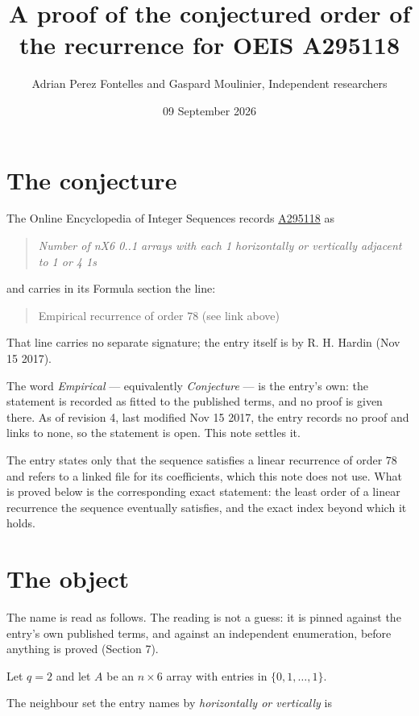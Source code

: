 \documentclass[11pt]{article}
\title{A proof of the conjectured order of the recurrence for OEIS A295118}
\author{Adrian Perez Fontelles and Gaspard Moulinier, Independent researchers}
\date{09 September 2026}
\theoremstyle{definition}
\begin{document}
\maketitle
\section{The conjecture}

The Online Encyclopedia of Integer Sequences records \href{https://oeis.org/A295118}{A295118} as

\begin{quote}\itshape Number of nX6 0..1 arrays with each 1 horizontally or vertically adjacent to 1 or 4 1s\end{quote}

and carries in its Formula section the line:

\begin{quote}\ttfamily Empirical recurrence of order 78 (see link above)\end{quote}

That line carries no separate signature; the entry itself is by R. H. Hardin (Nov 15 2017).

The word {\itshape Empirical} --- equivalently {\itshape Conjecture} --- is the entry's own: the statement is recorded as fitted to the published terms, and no proof is given there. As of revision 4, last modified Nov 15 2017, the entry records no proof and links to none, so the statement is open. This note settles it.

The entry states only that the sequence satisfies a linear recurrence of order $78$ and refers to a linked file for its coefficients, which this note does not use. What is proved below is the corresponding exact statement: the least order of a linear recurrence the sequence eventually satisfies, and the exact index beyond which it holds.

\section{The object}

The name is read as follows. The reading is not a guess: it is pinned against the entry's own published terms, and against an independent enumeration, before anything is proved (Section 7).

Let $q = 2$ and let $A$ be an $n \times 6$ array with entries in $\{0,1,\dots,1\}$.

The neighbour set the entry names by {\itshape horizontally or vertically} is
\end{document}
